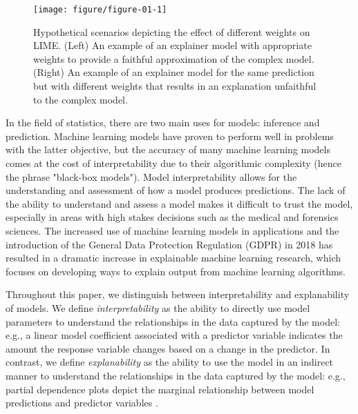 \documentclass[AMS,STIX2COL]{WileyNJD-v2}\usepackage[]{graphicx}\usepackage[]{color}
\newenvironment{knitrout}{}{} %
\renewcommand{\sout}[1]{\unskip}
\begin{document}
\begin{figure}[!thp]
\begin{knitrout}
\color{fgcolor}

{\centering \texttt{[image: figure/figure-01-1]} 

}



\end{knitrout}
\caption{Hypothetical scenarios depicting the effect of different weights on LIME. (Left) An example of an explainer model with appropriate weights to provide a faithful approximation of the complex model. (Right) An example of an explainer model for the same prediction but with different weights that results in an explanation unfaithful to the complex model.}
\label{fig:figure-01}
\end{figure}

In the field of statistics, there are two main uses for models: inference and prediction. Machine learning models have proven to perform well in problems with the latter objective, but the accuracy of many machine learning models comes at the cost of interpretability due to their algorithmic complexity (hence the phrase "black-box models"). Model interpretability allows for the understanding and assessment of how a model produces predictions. The lack of the ability to understand and assess a model makes it difficult to trust the model, especially in areas with high stakes decisions such as the medical and forensics sciences. The increased use of machine learning models in applications and the introduction of the General Data Protection Regulation (GDPR) in 2018 \citep{goodman:2016} has resulted in a dramatic increase in explainable machine learning research, which focuses on developing ways to explain output from machine learning algorithms.

Throughout this paper, we distinguish between interpretability and explanability of models. We define {\it interpretability} as the ability to directly use model parameters to understand the relationships in the data captured by the model: e.g., a linear model coefficient associated with a predictor variable indicates the amount the response variable changes based on a change in the predictor\sout{ variable}. In contrast, we define {\it explanability} as the ability to use the model in an indirect manner to understand the relationships in the data captured by the model: e.g., partial dependence plots depict the marginal relationship between model predictions and predictor variables \citep{friedman:2001}.
\end{document}
